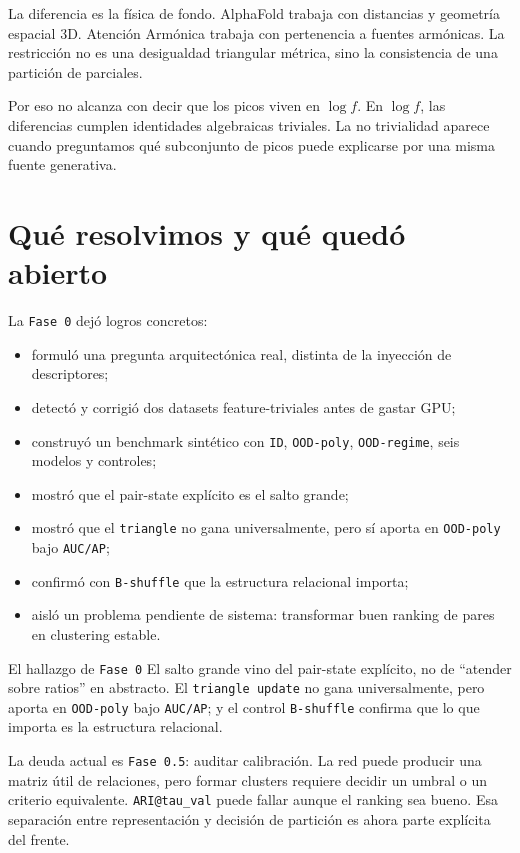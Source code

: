 \documentclass[11pt]{article}
\begin{document}
La diferencia es la física de fondo. AlphaFold trabaja con distancias y geometría espacial 3D. Atención Armónica trabaja con pertenencia a fuentes armónicas. La restricción no es una desigualdad triangular métrica, sino la consistencia de una partición de parciales.

Por eso no alcanza con decir que los picos viven en $\log f$. En $\log f$, las diferencias cumplen identidades algebraicas triviales. La no trivialidad aparece cuando preguntamos qué subconjunto de picos puede explicarse por una misma fuente generativa.

\section{Qué resolvimos y qué quedó abierto}

La \texttt{Fase 0} dejó logros concretos:

\begin{itemize}
  \item formuló una pregunta arquitectónica real, distinta de la inyección de descriptores;
  \item detectó y corrigió dos datasets feature-triviales antes de gastar GPU;
  \item construyó un benchmark sintético con \texttt{ID}, \texttt{OOD-poly}, \texttt{OOD-regime}, seis modelos y controles;
  \item mostró que el pair-state explícito es el salto grande;
  \item mostró que el \texttt{triangle} no gana universalmente, pero sí aporta en \texttt{OOD-poly} bajo \texttt{AUC/AP};
  \item confirmó con \texttt{B-shuffle} que la estructura relacional importa;
  \item aisló un problema pendiente de sistema: transformar buen ranking de pares en clustering estable.
\end{itemize}

\begin{keybox}{El hallazgo de \texttt{Fase 0}}
El salto grande vino del pair-state explícito, no de ``atender sobre ratios'' en abstracto. El \texttt{triangle update} no gana universalmente, pero aporta en \texttt{OOD-poly} bajo \texttt{AUC/AP}; y el control \texttt{B-shuffle} confirma que lo que importa es la estructura relacional.
\end{keybox}

La deuda actual es \texttt{Fase 0.5}: auditar calibración. La red puede producir una matriz útil de relaciones, pero formar clusters requiere decidir un umbral o un criterio equivalente. \texttt{ARI@tau\_val} puede fallar aunque el ranking sea bueno. Esa separación entre representación y decisión de partición es ahora parte explícita del frente.
\end{document}
